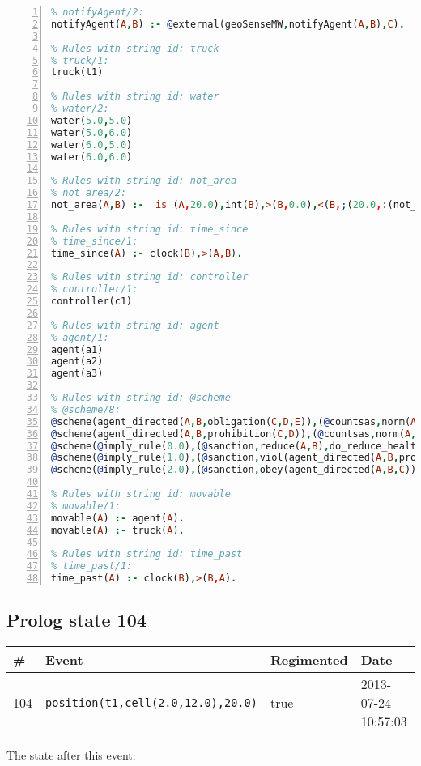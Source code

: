 \documentclass[11pt]{article}\usepackage[utf8]{inputenc}\usepackage{geometry}
\begin{document}
\begin{lstlisting}[language=Prolog, numbers=left]
% Rules with string id: notifyAgent
% notifyAgent/2:
notifyAgent(A,B) :- @external(geoSenseMW,notifyAgent(A,B),C).

% Rules with string id: truck
% truck/1:
truck(t1)

% Rules with string id: water
% water/2:
water(5.0,5.0)
water(5.0,6.0)
water(6.0,5.0)
water(6.0,6.0)

% Rules with string id: not_area
% not_area/2:
not_area(A,B) :-  is (A,20.0),int(B),>(B,0.0),<(B,;(20.0,:(not_area(A,B), is (-(B),20.0)))),int(A),>(A,0.0),<(A,;(20.0,:(area(A,B),-(int(A))))),int(B),>(A,0.0),>(B,0.0),<(A,21.0),<(B,21.0).

% Rules with string id: time_since
% time_since/1:
time_since(A) :- clock(B),>(A,B).

% Rules with string id: controller
% controller/1:
controller(c1)

% Rules with string id: agent
% agent/1:
agent(a1)
agent(a2)
agent(a3)

% Rules with string id: @scheme
% @scheme/8:
@scheme(agent_directed(A,B,obligation(C,D,E)),(@countsas,norm(A,B,F,obligation(C,D,E)),F),false,(listTrue(C)),(time_past(D)),false,[plus(viol(agent_directed(A,B,obligation(C,D,E))))|[]],[plus(obey(agent_directed(A,B,obligation(C,D,E))))|[]])
@scheme(agent_directed(A,B,prohibition(C,D)),(@countsas,norm(A,B,E,prohibition(C,D)),E),(listTrue(C)),false,(false),false,[plus(viol(agent_directed(A,B,prohibition(C,D))))|[]],[plus(obey(agent_directed(A,B,prohibition(C,D))))|[]])
@scheme(@imply_rule(0.0),(@sanction,reduce(A,B),do_reduce_health(A,B),notifyAgent(A,changed(status))),true,false,false,false,[min(reduce(A,B))|[]],[])
@scheme(@imply_rule(1.0),(@sanction,viol(agent_directed(A,B,prohibition(C,D))),do_sanction(D)),true,false,false,false,[min(viol(agent_directed(A,B,prohibition(C,D))))|[]],[])
@scheme(@imply_rule(2.0),(@sanction,obey(agent_directed(A,B,C))),true,false,false,false,[min(obey(agent_directed(A,B,C)))|[]],[])

% Rules with string id: movable
% movable/1:
movable(A) :- agent(A).
movable(A) :- truck(A).

% Rules with string id: time_past
% time_past/1:
time_past(A) :- clock(B),>(B,A).

\end{lstlisting}
\clearpage 
\subsection{Prolog state 104}
\begin{table}[ht]
\centering 
\begin{tabular}{l l l l} 
\textbf{\#} & \textbf{Event} & \textbf{Regimented} & \textbf{Date} \\ [0.5ex] 
\hline
104&\texttt{position(t1,cell(2.0,12.0),20.0)}&true&2013-07-24 10:57:03\\ [1ex] \hline\end{tabular}
\end{table}
The state after this event:
\end{document}
